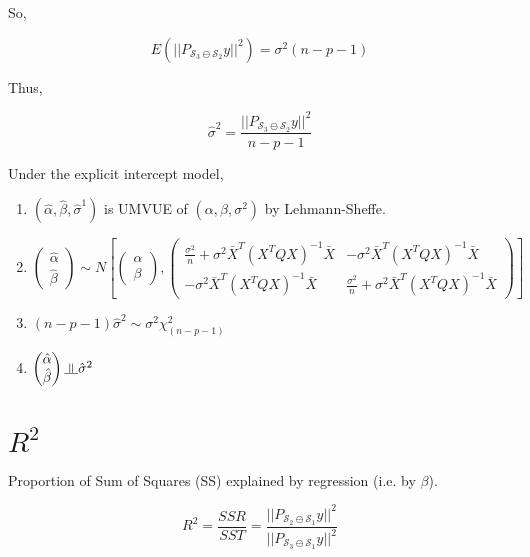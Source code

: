 \documentclass[11pt,fleqn]{book} %
\newcommand{\indep}{\rotatebox[origin=c]{90}{$\models$}}
\begin{document}
So, 

$$E(||P_{\mathscr{S}_3 \ominus \mathscr{S}_2}y||^2 ) = \sigma^2 (n-p-1)$$

Thus, 

$$\hat{\sigma}^2 = \frac{||P_{\mathscr{S}_3 \ominus \mathscr{S}_2}y||^2 }{n-p-1}$$

\begin{theorem}
	Under the explicit intercept model, 

	\begin{enumerate}
		\item $(\hat{\alpha}, \hat{\beta}, \hat{\sigma}^1)$ is UMVUE of $(\alpha, \beta, \sigma^2)$ by Lehmann-Sheffe.
		\item $$ \begin{pmatrix}
	\hat{\alpha}\\
	\hat{\beta}
\end{pmatrix} \sim N[\begin{pmatrix}
	\alpha\\
	\beta
\end{pmatrix}, \begin{pmatrix}
	\frac{\sigma^2}{n} + \sigma^2 \bar{X}^T(X^TQX)^{-1} \bar{X} & - \sigma^2 \bar{X}^T(X^TQX)^{-1} \bar{X}\\
	- \sigma^2 \bar{X}^T(X^TQX)^{-1} \bar{X} & \frac{\sigma^2}{n} + \sigma^2 \bar{X}^T(X^TQX)^{-1} \bar{X}
\end{pmatrix}]$$
	\item $(n-p-1) \hat{\sigma}^2 \sim \sigma^2 \chi^2_{(n-p-1)}$
	\item $\begin{pmatrix}
			\hat{\alpha}\\
			\hat{\beta}
		\end{pmatrix} \indep \hat{\sigma}^2$
	\end{enumerate}
\end{theorem}







\section{$R^2$}

Proportion of Sum of Squares (SS) explained by regression (i.e. by $\beta$). 

$$R^2 = \frac{SSR}{SST} = \frac{||P_{\mathscr{S}_2 \ominus \mathscr{S}_1}y||^2}{||P_{\mathscr{S}_3 \ominus \mathscr{S}_1}y||^2}$$
\end{document}
